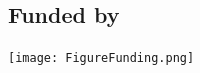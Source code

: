 \documentclass[a0,portrait]{a0poster}
\begin{document}
\begin{multicols}{3}
\small
\nocite{*} %


\section*{Funded by}
\begin{center}\vspace{0cm}
\texttt{[image: FigureFunding.png]}
\end{center}%


\end{multicols}
\end{document}
